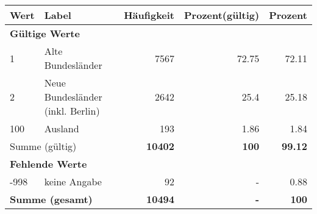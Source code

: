      \begin{longtable}{lXrrr}
     \toprule
     \textbf{Wert} & \textbf{Label} & \textbf{Häufigkeit} & \textbf{Prozent(gültig)} & \textbf{Prozent} \\
     \endhead
     \midrule
     \multicolumn{5}{l}{\textbf{Gültige Werte}}\\

     1 &
     \multicolumn{1}{X}{ Alte Bundesländer   } &


       \num{7567} &
       \num[round-mode=places,round-precision=2]{72.75} &
         \num[round-mode=places,round-precision=2]{72.11} \\

     2 &
     \multicolumn{1}{X}{ Neue Bundesländer (inkl. Berlin)   } &


       \num{2642} &
       \num[round-mode=places,round-precision=2]{25.4} &
         \num[round-mode=places,round-precision=2]{25.18} \\

     100 &
     \multicolumn{1}{X}{ Ausland   } &


       \num{193} &
       \num[round-mode=places,round-precision=2]{1.86} &
         \num[round-mode=places,round-precision=2]{1.84} \\
     \midrule
     \multicolumn{2}{l}{Summe (gültig)} &
       \textbf{\num{10402}} &
     \textbf{\num{100}} &
       \textbf{\num[round-mode=places,round-precision=2]{99.12}} \\
     \multicolumn{5}{l}{\textbf{Fehlende Werte}}\\
       -998 &
       keine Angabe &
         \num{92} &
        - &
         \num[round-mode=places,round-precision=2]{0.88} \\
     \midrule
     \multicolumn{2}{l}{\textbf{Summe (gesamt)}} &
          \textbf{\num{10494}} &
        \textbf{-} &
        \textbf{\num{100}} \\
     \bottomrule
     \end{longtable}
     

